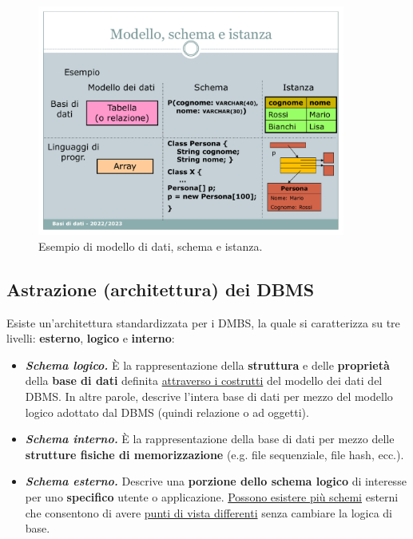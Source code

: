 \documentclass[a4paper]{article}
\begin{document}
	\begin{figure}[!htp]
		\centering
		\includegraphics[width=0.9\textwidth]{img/diff_modello-schemi-istanze.pdf}
		\caption{Esempio di modello di dati, schema e istanza.}
	\end{figure}

	\newpage
	
	
	
	
	\subsection{Astrazione (architettura) dei DBMS}\label{Astrazione (architettura) dei DBMS}
	
	Esiste un'architettura standardizzata per i DMBS, la quale si caratterizza su tre livelli: \textbf{esterno}, \textbf{logico} e \textbf{interno}:
	
	\begin{itemize}
		\item[\ding{80}] \textbf{\emph{Schema logico.}} È la rappresentazione della \textbf{struttura} e delle \textbf{proprietà} della \textbf{base di dati} definita \underline{attraverso i costrutti} del modello dei dati del DBMS. In altre parole, descrive l'intera base di dati per mezzo del modello logico adottato dal DBMS (quindi relazione o ad oggetti).
		
		\item[\ding{72}] \textbf{\emph{Schema interno.}} È la rappresentazione della base di dati per mezzo delle \textbf{strutture fisiche di memorizzazione} (e.g. file sequenziale, file hash, ecc.).
		
		\item[\ding{73}] \textbf{\emph{Schema esterno.}}\label{schema esterno} Descrive una \textbf{porzione dello schema logico} di interesse per uno \textbf{specifico} utente o applicazione. \underline{Possono esistere più schemi} esterni che consentono di avere \underline{punti di vista differenti} senza cambiare la logica di base.
	\end{itemize}
\end{document}
